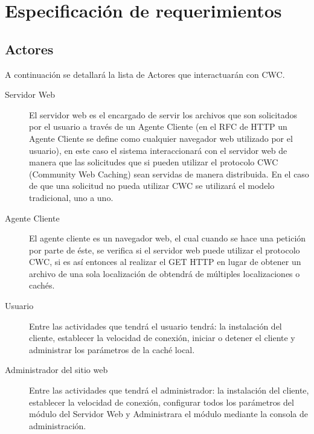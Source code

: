 
\chapter{Especificación de requerimientos} %

\label{ch:especificacion_requerimientos} %


\section{Actores}

A continuación se detallará la lista de Actores que interactuarán con CWC. 

\begin{description}
\item[Servidor Web] El servidor web es el encargado de servir los archivos que son solicitados por el usuario a través de un Agente Cliente (en el RFC de HTTP \cite{rfc2616} un Agente Cliente se define como cualquier navegador web utilizado por el usuario), en este caso el sistema interaccionará con el servidor web de manera que las solicitudes que si pueden utilizar el protocolo CWC (Community Web Caching) sean servidas de manera distribuida. En el caso de que una solicitud no pueda utilizar CWC se utilizará el modelo tradicional, uno a uno.
\item[Agente Cliente] El agente cliente es un navegador web, el cual cuando se hace una petición por parte de éste, se verifica si el servidor web puede utilizar el protocolo CWC, si es así entonces al realizar el GET HTTP en lugar de obtener un archivo de una sola localización de obtendrá de múltiples localizaciones o cachés.
\item[Usuario] Entre las actividades que tendrá el usuario tendrá: la instalación del cliente, establecer la velocidad de conexión, iniciar o detener el cliente y administrar los parámetros de la caché local. 
\item[Administrador del sitio web] Entre las actividades que tendrá el administrador: la instalación del cliente, establecer la velocidad de conexión, configurar todos los parámetros del módulo del Servidor Web y Administrara el módulo mediante la consola de administración.
\end{description}

